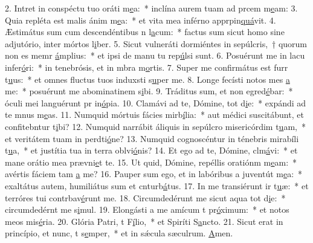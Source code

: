 2. Intret in conspéctu tuo oráti m\uline{e}a:~* inclína aurem tuam ad prcem m\uline{e}am:
3. Quia repléta est malis ánim m\uline{e}a:~* et vita mea inférno apprpin\uline{quá}vit.
4. Æstimátus sum cum descendéntibus n l\uline{a}cum:~* factus sum sicut homo sine adjutório, inter mórtos l\uline{i}ber.
5. Sicut vulneráti dormiéntes in sepúlcris,~† quorum non es memr \uline{á}mplius:~* et ipsi de manu tu rep\uline{ú}lsi sunt.
6. Posuérunt me in lacu infer\uline{ó}ri:~* in tenebrósis, et in mbra m\uline{o}rtis.
7. Super me confirmátus est furr t\uline{u}us:~* et omnes fluctus tuos induxsti s\uline{u}per me.
8. Longe fecísti notos mes \uline{a} me:~* posuérunt me abominatinem s\uline{i}bi.
9. Tráditus sum, et non egred\uline{é}bar:~* óculi mei languérunt pr in\uline{ó}pia.
10. Clamávi ad te, Dómine, tot d\uline{i}e:~* expándi ad te mnus m\uline{e}as.
11. Numquid mórtuis fácies mirb\uline{í}lia:~* aut médici suscitábunt, et confitebntur t\uline{i}bi?
12. Numquid narrábit áliquis in sepúlcro misericórdim t\uline{u}am,~* et veritátem tuam in perdti\uline{ó}ne?
13. Numquid cognoscéntur in ténebris mirabíli t\uline{u}a,~* et justítia tua in terra oblvi\uline{ó}nis?
14. Et ego ad te, Dómine, clm\uline{á}vi:~* et mane orátio mea prævni\uline{e}t te.
15. Ut quid, Dómine, repéllis oratiónm m\uline{e}am:~* avértis fáciem tam \uline{a} me?
16. Pauper sum ego, et in labóribus a juventút m\uline{e}a:~* exaltátus autem, humiliátus sum et cnturb\uline{á}tus.
17. In me transiérunt ir t\uline{u}æ:~* et terróres tui contrbav\uline{é}runt me.
18. Circumdedérunt me sicut aqua tot d\uline{i}e:~* circumdedérnt me s\uline{i}mul.
19. Elongásti a me amícum t pr\uline{ó}ximum:~* et notos meos  mis\uline{é}ria.
20. Glória Patri, t F\uline{í}lio,~* et Spiríti S\uline{a}ncto.
21. Sicut erat in princípio, et nunc, t s\uline{e}mper,~* et in sǽcula sæculrum. \uline{A}men.
